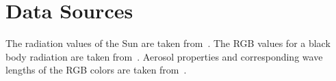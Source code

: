 \documentclass[10pt,twocolumn,letterpaper]{article}
\begin{document}
\section{Data Sources}

The radiation values of the Sun are taken
from~\cite{sun_composition}. The RGB values for a black body radiation
are taken from~\cite{BBradiance}. Aerosol properties and corresponding
wave lengths of the RGB colors are taken from~\cite{Martonchik2009}.

{\small


}
\end{document}
